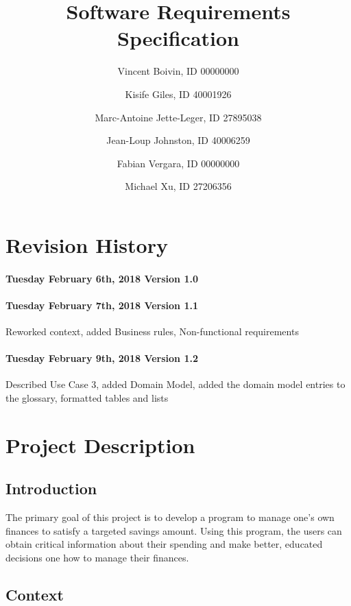 \documentclass[letterpaper]{article}
\title{Software Requirements Specification}
\author{
	Vincent Boivin, ID 00000000 \and
	Kisife Giles, ID 40001926 \and
	Marc-Antoine Jette-Leger, ID 27895038 \and
	Jean-Loup Johnston, ID 40006259 \and
	Fabian Vergara, ID 00000000 \and
	Michael Xu, ID 27206356
}
\begin{document}
	
\maketitle

\newpage

\section{Revision History}

	\paragraph{Tuesday February 6th, 2018 Version 1.0}  
	
	\paragraph{Tuesday February 7th, 2018 Version 1.1}  
	Reworked context, added Business rules, Non-functional requirements
	
	\paragraph{Tuesday February 9th, 2018 Version 1.2}  
	Described Use Case 3, added Domain Model, added the domain model entries to the glossary, formatted tables and lists
	
\newpage

\tableofcontents

\newpage
	
\section{Project Description}

	\subsection{Introduction}
	
		The primary goal of this project is to develop a program to manage one’s own finances to satisfy a targeted savings amount. Using this program, the users can obtain critical information about their spending and make better, educated decisions one how to manage their finances.
	
	\subsection{Context}
	
\end{document}
